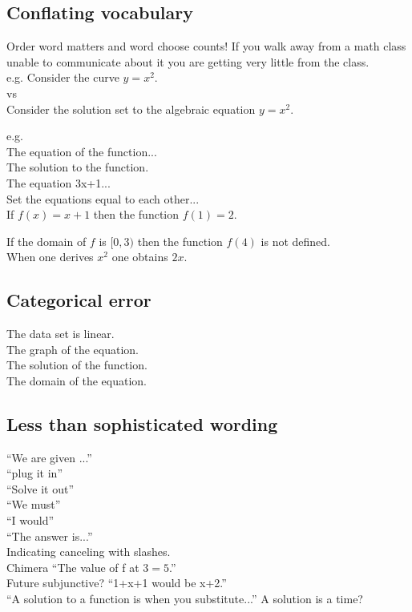 \documentclass[12pt]{article}
\def\noi{\noindent}
\begin{document}
\subsection{Conflating vocabulary}
Order word matters and word choose counts! If you walk away from a math class unable to communicate about it you are getting very little from the class.  \\

e.g. 
Consider the curve $y=x^2$.\\
vs\\
Consider the solution set to the algebraic equation $y=x^2$.

\noi e.g. \\
The equation of the function...\\

\noi The solution to the function.\\

\noi The equation 3x+1...\\

\noi Set the equations equal to each other... \\

\noi If $f(x)=x+1$ then the function $f(1)=2$.

\noi If the domain of $f$ is $[0,3)$ then the function $f(4)$ is not defined.\\

\noi When one derives $x^2$ one obtains $2x$.

\subsection{Categorical error}

The data set is linear. \\

The graph of the equation.\\

The solution of the function. \\

The domain of the equation. \\


\subsection{Less than sophisticated wording}
``We are given ...''\\
``plug it in''\\
``Solve it out''\\
``We must''\\
``I would'' \\
``The answer is...''\\
Indicating canceling with slashes.\\
Chimera ``The value of f at $3= 5$.''\\
Future subjunctive? ``1+x+1 would be x+2.'' \\
``A solution to a function is when you substitute...'' A solution is a time? \\ 
\end{document}
